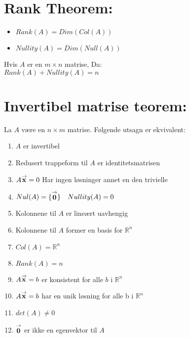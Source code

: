 \documentclass[12pt,a4paper,twocolumn,twoside]{article}
\def\real{\mathbb{R}}
\def\vector#1{\bold{\stackrel{\rightarrow}{#1}}}
\begin{document}
\section*{Rank Theorem:}
\begin{itemize}[topsep=0pt,itemsep=0pt, partopsep=0pt]
    \item $Rank(A) = Dim(Col(A))$
    \item $Nullity(A) = Dim(Null(A))$
\end{itemize}
Hvis $A$ er en $m \times n$ matrise, Da:\\ $Rank(A)+Nullity(A)=n$
\section*{Invertibel matrise teorem:}
La $A$ være en $n\times m$ matrise. Følgende utsagn er ekvivalent:
\begin{enumerate}[topsep=0pt,itemsep=0pt, partopsep=0pt]
    \item $A$ er invertibel
    \item Redusert trappeform til $A$ er identitetsmatrisen
    \item $A\vector{x}=0$ Har ingen løsninger annet en den trivielle
    \item $Nul(A) = \{\vector{0}\}\quad Nullity(A) = 0$
    \item Kolonnene til $A$ er lineært uavhengig
    \item Kolonnene til $A$ former en basis for $\real^n$
    \item $Col(A) = \real^n$
    \item $Rank(A)=n$
    \item $A\vector{x}=b$ er konsistent for alle $b$ i $\real^n$
    \item $A\vector{x}=b$ har en unik løsning for alle b i $\real^n$
    \item $det(A)\neq 0$
    \item $\vector{0}$ er ikke en egenvektor til $A$
\end{enumerate}
\end{document}
